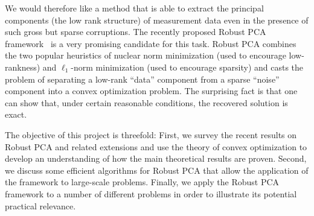 We would therefore like a method that is able to extract the principal components (the low rank structure) of measurement data even in the presence of such gross but sparse corruptions. The recently proposed Robust PCA framework~\cite{Candes:2011fk} is a very promising candidate for this task. Robust PCA combines the two popular heuristics of nuclear norm minimization (used to encourage low-rankness) and $\ell_1$-norm minimization (used to encourage sparsity) and casts the problem of separating a low-rank ``data'' component from a sparse ``noise'' component into a convex optimization problem. The surprising fact is that one can show that, under certain reasonable conditions, the recovered solution is exact. 

The objective of this project is threefold: First, we survey the recent results on Robust PCA and related extensions and use the theory of convex optimization to develop an understanding of how the main theoretical results are proven. Second, we discuss some efficient algorithms for Robust PCA that allow the application of the framework to large-scale problems. Finally, we apply the Robust PCA framework to a number of different problems in order to illustrate its potential practical relevance. 